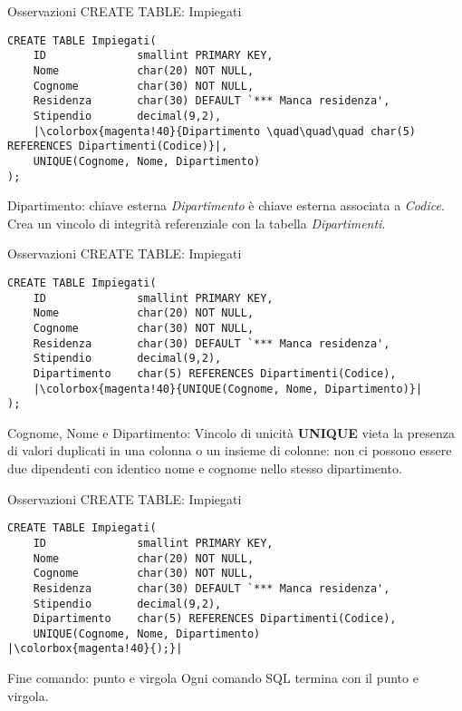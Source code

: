 %
\begin{frame}[fragile]{Osservazioni CREATE TABLE: Impiegati}
\begin{lstlisting}
CREATE TABLE Impiegati(
    ID              smallint PRIMARY KEY,
    Nome            char(20) NOT NULL,
    Cognome         char(30) NOT NULL,
    Residenza       char(30) DEFAULT `*** Manca residenza',
    Stipendio       decimal(9,2),
    |\colorbox{magenta!40}{Dipartimento \quad\quad\quad char(5) REFERENCES Dipartimenti(Codice)}|,
    UNIQUE(Cognome, Nome, Dipartimento)
);
\end{lstlisting}
\begin{block}{Dipartimento: chiave esterna}
    \textit{Dipartimento} \`e chiave esterna associata a \textit{Codice}. Crea un vincolo di integrit\`a referenziale con la tabella \textit{Dipartimenti}.
\end{block}
\end{frame}
%
\begin{frame}[fragile]{Osservazioni CREATE TABLE: Impiegati}
\begin{lstlisting}
CREATE TABLE Impiegati(
    ID              smallint PRIMARY KEY,
    Nome            char(20) NOT NULL,
    Cognome         char(30) NOT NULL,
    Residenza       char(30) DEFAULT `*** Manca residenza',
    Stipendio       decimal(9,2),
    Dipartimento    char(5) REFERENCES Dipartimenti(Codice),
    |\colorbox{magenta!40}{UNIQUE(Cognome, Nome, Dipartimento)}|
);
\end{lstlisting}
\begin{block}{Cognome, Nome e Dipartimento: Vincolo di unicit\`a}
    \textbf{UNIQUE} vieta la presenza di valori duplicati in una colonna o un insieme di colonne: non ci possono essere due dipendenti con identico nome e cognome nello stesso dipartimento.
\end{block}
\end{frame}
%
\begin{frame}[fragile]{Osservazioni CREATE TABLE: Impiegati}
\begin{lstlisting}
CREATE TABLE Impiegati(
    ID              smallint PRIMARY KEY,
    Nome            char(20) NOT NULL,
    Cognome         char(30) NOT NULL,
    Residenza       char(30) DEFAULT `*** Manca residenza',
    Stipendio       decimal(9,2),
    Dipartimento    char(5) REFERENCES Dipartimenti(Codice),
    UNIQUE(Cognome, Nome, Dipartimento)
|\colorbox{magenta!40}{);}|
\end{lstlisting}
\begin{minipage}{0.6\textwidth}
    \begin{block}{Fine comando: punto e virgola}
        Ogni comando SQL termina con il punto e virgola.
    \end{block}
\end{minipage}
\end{frame}
